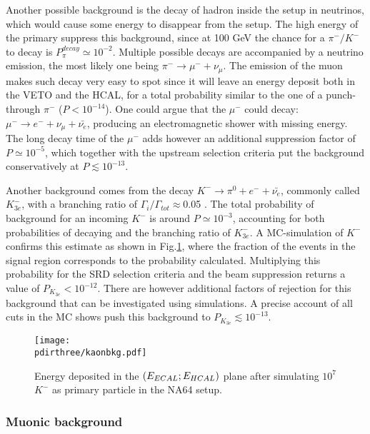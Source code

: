 Another possible background is the decay of hadron inside the setup in neutrinos, which would cause some energy to disappear from the setup. The high energy of the primary suppress this background, since at 100 GeV the chance for a $\pi^-/K^-$ to decay is $P^{decay}_{\pi} \simeq  10^{-2}$. Multiple possible decays are accompanied by a neutrino emission, the most likely one being $\pi^- \rightarrow \mu^- +\nu_{\mu}$. The emission of the muon makes such decay very easy to spot since it will leave an energy deposit both in the VETO and the HCAL, for a total probability similar to the one of a punch-through $\pi^-$ ($P < 10^{-14}$). One could argue that the $\mu^-$ could decay: $\mu^- \rightarrow e^- + \nu_{\mu}+ \bar{\nu_{e}}$, producing an electromagnetic shower with missing energy. The long decay time of the $\mu^-$ adds however an additional suppression factor of $P\simeq 10^{-5}$, which together with the upstream selection criteria put the background conservatively at $P \lesssim 10^{-13}$.

Another background comes from the decay $K^- \rightarrow \pi^0 + e^- + \bar{\nu_e}$, commonly called $K^-_{3e}$, with a branching ratio of $\Gamma_i/\Gamma_{tot} \approx$0.05 \cite{particle-strange-mesons}. The total probability of background for an incoming $K^-$ is around $P\simeq 10^{-3}$, accounting for both probabilities of decaying and the branching ratio of $K^-_{3e}$. A MC-simulation of $K^-$ confirms this estimate as shown in Fig.\ref{fig:kaonbkg-sim}, where the fraction of the events in the signal region corresponds to the probability calculated. 
Multiplying this probability for the SRD selection criteria and the beam suppression returns a value of $P_{K_{3e}} < 10^{-12}$.
There are however additional factors of rejection for this background that can be investigated using simulations. A precise account of all cuts in the MC shows push this background to $P_{K_{3e}} \lesssim 10^{-13}$.


\begin{figure}[bth!]
  \centering
  \texttt{[image: \\pdirthree/kaonbkg.pdf]}
  \caption[$K^-$ simulation ]{Energy deposited in the $(E_{ECAL};E_{HCAL})$ plane after simulating $10^7$ $K^-$ as primary particle in the NA64 setup.}
  \label{fig:kaonbkg-sim}
\end{figure}

\subsubsection{Muonic background}
\label{ch3:sec:bkg:inv:muon}

